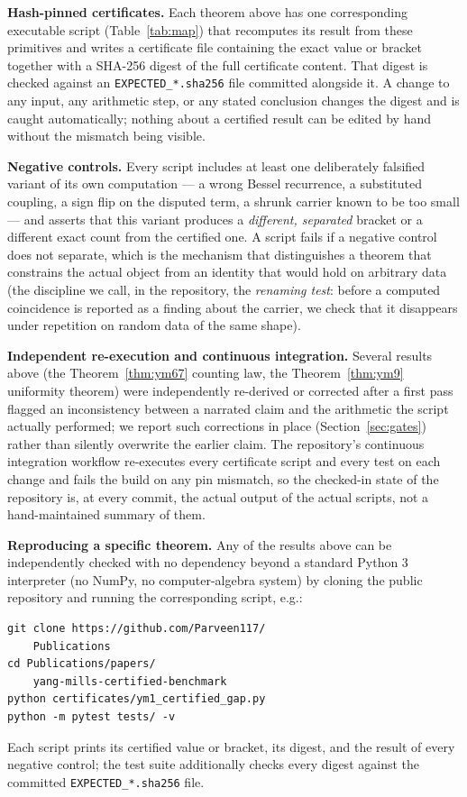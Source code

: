 \documentclass[aps,prd,twocolumn,superscriptaddress,nofootinbib]{revtex4-2}
\begin{document}
\textbf{Hash-pinned certificates.} Each theorem above has one
corresponding executable script (Table~\ref{tab:map}) that recomputes
its result from these primitives and writes a certificate file
containing the exact value or bracket together with a SHA-256 digest of
the full certificate content. That digest is checked against an
\texttt{EXPECTED\_*.sha256} file committed alongside it. A change to any
input, any arithmetic step, or any stated conclusion changes the digest
and is caught automatically; nothing about a certified result can be
edited by hand without the mismatch being visible.

\textbf{Negative controls.} Every script includes at least one
deliberately falsified variant of its own computation --- a wrong Bessel
recurrence, a substituted coupling, a sign flip on the disputed term,
a shrunk carrier known to be too small --- and asserts that this variant
produces a \emph{different, separated} bracket or a different exact
count from the certified one. A script fails if a negative control does
not separate, which is the mechanism that distinguishes a theorem that
constrains the actual object from an identity that would hold on
arbitrary data (the discipline we call, in the repository, the
\emph{renaming test}: before a computed coincidence is reported as a
finding about the carrier, we check that it disappears under repetition
on random data of the same shape).

\textbf{Independent re-execution and continuous integration.} Several
results above (the Theorem~\ref{thm:ym67} counting law, the
Theorem~\ref{thm:ym9} uniformity theorem) were independently re-derived
or corrected after a first pass flagged an inconsistency between a
narrated claim and the arithmetic the script actually performed; we
report such corrections in place (Section~\ref{sec:gates}) rather than
silently overwrite the earlier claim. The repository's continuous
integration workflow re-executes every certificate script and every test
on each change and fails the build on any pin mismatch, so the checked-in
state of the repository is, at every commit, the actual output of the
actual scripts, not a hand-maintained summary of them.

\textbf{Reproducing a specific theorem.} Any of the results above can be
independently checked with no dependency beyond a standard Python 3
interpreter (no NumPy, no computer-algebra system) by cloning the public
repository and running the corresponding script, e.g.:
\begin{verbatim}
git clone https://github.com/Parveen117/
    Publications
cd Publications/papers/
    yang-mills-certified-benchmark
python certificates/ym1_certified_gap.py
python -m pytest tests/ -v
\end{verbatim}
Each script prints its certified value or bracket, its digest, and the
result of every negative control; the test suite additionally checks
every digest against the committed \texttt{EXPECTED\_*.sha256} file.
\end{document}
